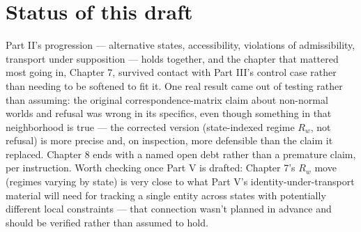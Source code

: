 \hypertarget{status-of-this-draft}{%
\section{Status of this draft}\label{status-of-this-draft}}

Part II's progression --- alternative states, accessibility, violations of
admissibility, transport under supposition --- holds together, and the
chapter that mattered most going in, Chapter 7, survived contact with
Part III's control case rather than needing to be softened to fit it.
One real result came out of testing rather than assuming: the original
correspondence-matrix claim about non-normal worlds and refusal was
wrong in its specifics, even though something in that neighborhood is
true --- the corrected version (state-indexed regime \(R_w\), not refusal)
is more precise and, on inspection, more defensible than the claim it
replaced. Chapter 8 ends with a named open debt rather than a premature
claim, per instruction. Worth checking once Part V is drafted: Chapter 7's
\(R_w\) move (regimes varying by state) is very close to what Part V's
identity-under-transport material will need for tracking a single
entity across states with potentially different local constraints ---
that connection wasn't planned in advance and should be verified rather
than assumed to hold.
